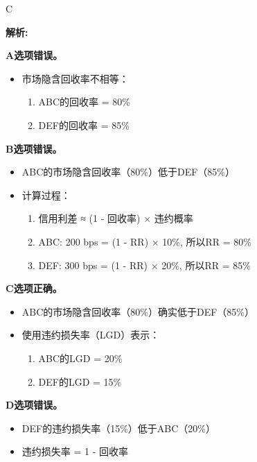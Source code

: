 \documentclass{article}
\newenvironment{explanation}
{\textbf{解析:}\par}
{\par}
\begin{document}
\begin{correctanswer}
    C
\end{correctanswer}

\begin{explanation}
    \textbf{A选项错误。}
    \begin{itemize}
        \item 市场隐含回收率不相等：
        \begin{enumerate}
            \item ABC的回收率 = 80\%
            \item DEF的回收率 = 85\%
        \end{enumerate}
    \end{itemize}
    
    \textbf{B选项错误。}
    \begin{itemize}
        \item ABC的市场隐含回收率（80\%）低于DEF（85\%）
        \item 计算过程：
        \begin{enumerate}
            \item 信用利差 ≈ (1 - 回收率) × 违约概率
            \item ABC: 200 bps = (1 - RR) × 10\%, 所以RR = 80\%
            \item DEF: 300 bps = (1 - RR) × 20\%, 所以RR = 85\%
        \end{enumerate}
    \end{itemize}
    
    \textbf{C选项正确。}
    \begin{itemize}
        \item ABC的市场隐含回收率（80\%）确实低于DEF（85\%）
        \item 使用违约损失率（LGD）表示：
        \begin{enumerate}
            \item ABC的LGD = 20\%
            \item DEF的LGD = 15\%
        \end{enumerate}
    \end{itemize}
    
    \textbf{D选项错误。}
    \begin{itemize}
        \item DEF的违约损失率（15\%）低于ABC（20\%）
        \item 违约损失率 = 1 - 回收率
    \end{itemize}
\end{explanation}
\end{document}
